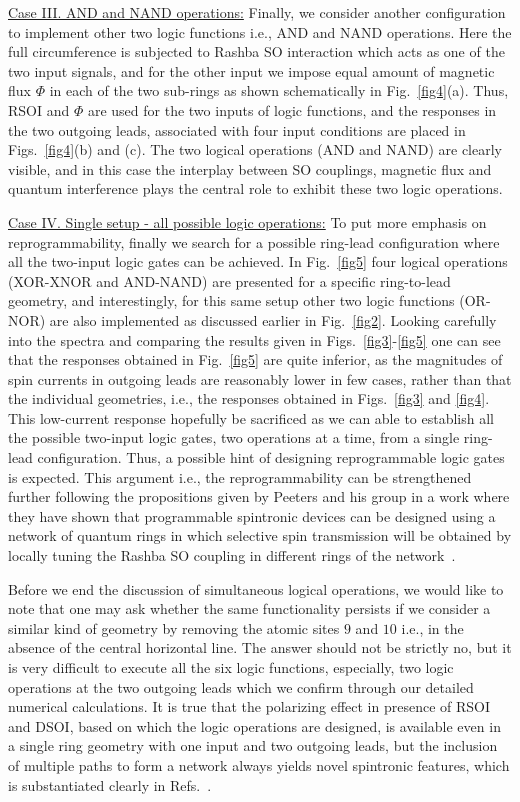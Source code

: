 \documentclass[doublecol]{epl2}
\begin{document}
\vskip 0.25cm
\noindent
{\underline{Case III. AND and NAND operations:}} Finally, we consider another
configuration to implement other two logic functions i.e., AND and NAND 
operations. Here the full circumference is subjected to Rashba SO interaction
which acts as one of the two input signals, and for the other input we impose 
equal amount of magnetic flux $\Phi$ in each of the two sub-rings as shown
schematically in Fig.~\ref{fig4}(a). Thus, RSOI and $\Phi$ are used for the 
two inputs of logic functions, and the responses in the two outgoing leads,
associated with four input conditions are placed in Figs.~\ref{fig4}(b) and (c).
The two logical operations (AND and NAND) are clearly visible, and in this case
the interplay between SO couplings, magnetic flux and quantum interference plays
the central role to exhibit these two logic operations.

\vskip 0.25cm
\noindent
{\underline{Case IV. Single setup - all possible logic operations:}}
To put more emphasis on reprogrammability, finally we search for a 
possible ring-lead configuration where all the two-input logic gates can 
be achieved. In Fig.~\ref{fig5} four logical operations (XOR-XNOR 
and AND-NAND) are presented for a specific ring-to-lead geometry, and 
interestingly, for this same setup other two logic functions (OR-NOR) 
are also implemented as discussed earlier in Fig.~\ref{fig2}. 
Looking carefully into the spectra and comparing the results given 
in Figs.~\ref{fig3}-\ref{fig5} one can see that the responses
obtained in Fig.~\ref{fig5} are quite inferior, as the magnitudes 
of spin currents in outgoing leads are reasonably lower in few cases, 
rather than that the individual geometries, i.e., the responses obtained in
Figs.~\ref{fig3} and \ref{fig4}. This low-current response hopefully
be sacrificed as we can able to establish all the possible two-input logic 
gates, two operations at a time, from a single ring-lead configuration. 
Thus, a possible hint of designing reprogrammable logic gates is expected.
This argument i.e., the reprogrammability can be strengthened further 
following the propositions given by Peeters and his group in a work where 
they have shown that programmable spintronic devices can be designed using 
a network of quantum rings in which selective spin transmission will be 
obtained by locally tuning the Rashba SO coupling in different rings of the 
network~\cite{qnano}.

Before we end the discussion of simultaneous logical operations, we would
like to note that one may ask whether the same functionality persists if we
consider a similar kind of geometry by removing the atomic sites $9$ and 
$10$ i.e., in the absence of the central horizontal line. The answer should
not be strictly no, but it is very difficult to execute all the six logic
functions, especially, two logic operations at the two outgoing leads which
we confirm through our detailed numerical calculations. It is true that 
the polarizing 
effect in presence of RSOI and DSOI, based on which the logic operations 
are designed, is available even in a single ring geometry with one input 
and two outgoing leads, but the inclusion of multiple paths to form a 
network always yields novel spintronic features, which is substantiated 
clearly in Refs.~\cite{qnano,qnano1}.
\end{document}
